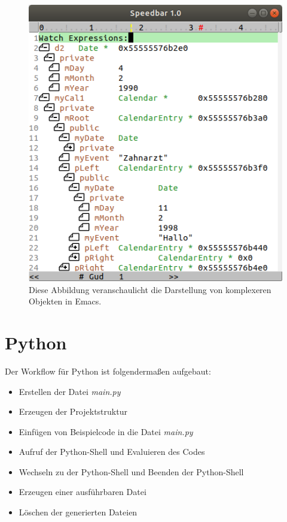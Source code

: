 \begin{figure}[H]
  \centering
  \includegraphics[width=.7\textwidth]{./images/Workflow/watch.png}
  \caption{\label{fig:watch} Diese Abbildung veranschaulicht die
    Darstellung von komplexeren Objekten in Emacs.}
\end{figure}

\section{Python}
\label{sec:python}
Der Workflow für Python ist folgendermaßen aufgebaut:
\begin{itemize}
\item Erstellen der Datei \textit{main.py}
\item Erzeugen der Projektstruktur
\item Einfügen von Beispielcode in die Datei \textit{main.py}
\item Aufruf der Python-Shell und Evaluieren des Codes
\item Wechseln zu der Python-Shell und Beenden der Python-Shell
\item Erzeugen einer ausführbaren Datei
\item Löschen der generierten Dateien
\end{itemize}


